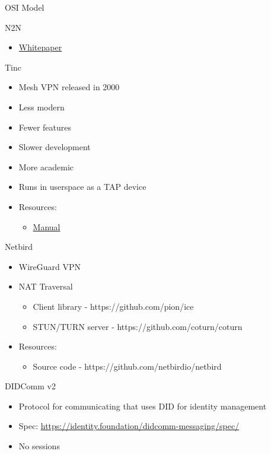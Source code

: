 \begin{frame}[fragile]{OSI Model}
\begin{block}{N2N}
\begin{itemize}
  \begin{itemize}
  \tightlist
  \item
    \href{http://luca.ntop.org/n2n.pdf}{Whitepaper}
  \end{itemize}
\end{itemize}
\end{block}

\begin{block}{Tinc}
\protect\hypertarget{tinc}{}
\begin{itemize}
\tightlist
\item
  Mesh VPN released in 2000
\item
  Less modern
\item
  Fewer features
\item
  Slower development
\item
  More academic
\item
  Runs in userspace as a TAP device
\item
  Resources:

  \begin{itemize}
  \tightlist
  \item
    \href{https://www.tinc-vpn.org/documentation-1.1/tinc.pdf}{Manual}
  \end{itemize}
\end{itemize}
\end{block}

\begin{block}{Netbird}
\protect\hypertarget{netbird}{}
\begin{itemize}
\tightlist
\item
  WireGuard VPN
\item
  NAT Traversal

  \begin{itemize}
  \tightlist
  \item
    Client library - https://github.com/pion/ice
  \item
    STUN/TURN server - https://github.com/coturn/coturn
  \end{itemize}
\item
  Resources:

  \begin{itemize}
  \tightlist
  \item
    Source code - https://github.com/netbirdio/netbird
  \end{itemize}
\end{itemize}
\end{block}

\begin{block}{DIDComm v2}
\protect\hypertarget{didcomm-v2}{}
\begin{itemize}
\tightlist
\item
  Protocol for communicating that uses DID for identity management
\item
  Spec: \url{https://identity.foundation/didcomm-messaging/spec/}
\item
  No sessions


\end{itemize}
\end{block}
\end{frame}
